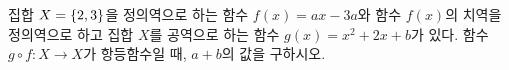 집합 $X=\{2{,}\mkern3mu\mathopen{}3\}$을 정의역으로 하는 함수 $f(x)=ax-3a$와 함수 $f(x)$의 치역을 정의역으로 하고 집합 $X$를 공역으로 하는 함수 $g(x)=x^2+2x+b$가 있다. 함수 $g\circ f:X\longrightarrow X$가 항등함수일 때, $a+b$의 값을 구하시오. 
